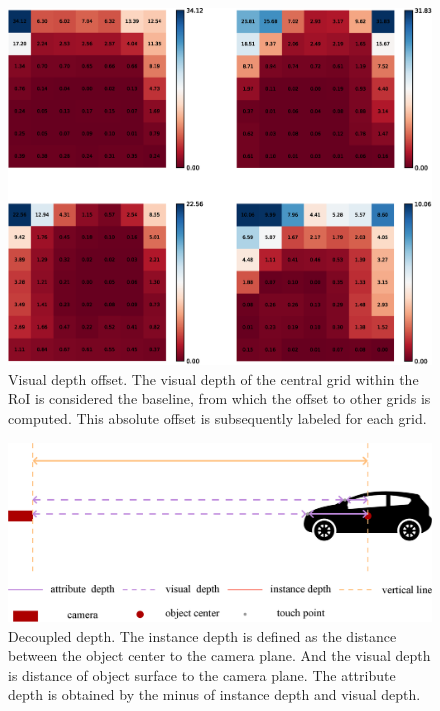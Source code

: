 \documentclass[journal]{IEEEtran}
\begin{document}
	\begin{figure}[!t]
		\centering
		\includegraphics[width=1.0\linewidth]{visual_depth_offset.eps}
		\caption{Visual depth offset. The visual depth of the central grid within the RoI is considered the baseline, from which the offset to other grids is computed. This absolute offset is subsequently labeled for each grid.}
		\label{fig:visual_depth_offset}
	\end{figure}
	\begin{figure}[!t]
		\centering
		\includegraphics[width=1.0\linewidth]{decoupled_depth.eps}
		\caption{Decoupled depth. The instance depth is defined as the distance between the object center to the camera plane. And the visual depth is distance of object surface to the camera plane. The attribute depth is obtained by the minus of instance depth and visual depth.}
		\label{fig:decoupled depth}
	\end{figure}
\end{document}

